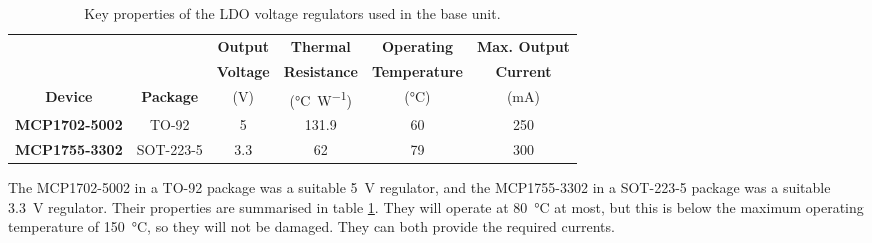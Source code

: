 \begin{table}[ht]
	\centering
	\caption{Key properties of the LDO voltage regulators used in the base unit.}
	\label{tab: ldo properties}
	\begin{adjustwidth}{-.5in}{-.5in}
	\begin{center}
	\begin{tabular}{|c|c|c|c|c|c|}
	\hline
	& & \textbf{Output} & \textbf{Thermal} & \textbf{Operating} & \textbf{Max. Output} \\
	& & \textbf{Voltage} & \textbf{Resistance} & \textbf{Temperature} & \textbf{Current}\\
	\textbf{Device} & \textbf{Package} &  (\si{\volt}) &  (\si{\celsius\per\watt}) &  (\si{\celsius}) &  (\si{\milli\ampere})\\
	\hline
	\textbf{MCP1702-5002} & TO-92 & 5 & 131.9 & 60 & 250 \\
	\hline
	\textbf{MCP1755-3302} & SOT-223-5 & 3.3 & 62 & 79 & 300 \\
	\hline
	\end{tabular}
	\end{center}
	\end{adjustwidth}
\end{table}

The MCP1702-5002 \cite{mcp1702} in a TO-92 package was a suitable \SI{5}{\volt} regulator, and the MCP1755-3302 in a SOT-223-5 package was a suitable \SI{3.3}{\volt} regulator. Their properties are summarised in table \ref{tab: ldo properties}. They will operate at \SI{80}{\celsius} at most, but this is below the maximum operating temperature of \SI{150}{\celsius}, so they will not be damaged. They can both provide the required currents.\\


